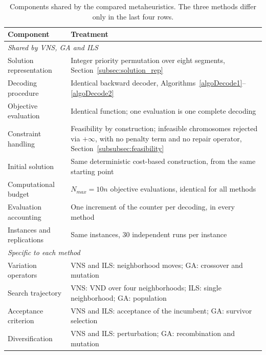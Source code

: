 \documentclass[preprint,12pt,authoryear]{elsarticle}
\begin{document}
\begin{table}[htbp]
    \centering
    \small
    \caption{Components shared by the compared metaheuristics. The three methods differ only in the last four rows.}
    \label{tab:shared_components}
    \begin{tabular}{p{} p{}}
        \toprule
        \textbf{Component} & \textbf{Treatment} \\
        \midrule
        \multicolumn{2}{l}{\textit{Shared by VNS, GA and ILS}} \\
        \midrule
        Solution representation & Integer priority permutation over eight segments, Section~\ref{subsec:solution_rep} \\
        Decoding procedure      & Identical backward decoder, Algorithms~\ref{algoDecode1}--\ref{algoDecode2} \\
        Objective evaluation    & Identical function; one evaluation is one complete decoding \\
        Constraint handling     & Feasibility by construction; infeasible chromosomes rejected via $+\infty$, with no penalty term and no repair operator, Section~\ref{subsubsec:feasibility} \\
        Initial solution        & Same deterministic cost-based construction, from the same starting point \\
        Computational budget    & $N_{max} = 10n$ objective evaluations, identical for all methods \\
        Evaluation accounting   & One increment of the counter per decoding, in every method \\
        Instances and replications & Same instances, 30 independent runs per instance \\
        \midrule
        \multicolumn{2}{l}{\textit{Specific to each method}} \\
        \midrule
        Variation operators     & VNS and ILS: neighborhood moves; GA: crossover and mutation \\
        Search trajectory       & VNS: VND over four neighborhoods; ILS: single neighborhood; GA: population \\
        Acceptance criterion    & VNS and ILS: acceptance of the incumbent; GA: survivor selection \\
        Diversification         & VNS and ILS: perturbation; GA: recombination and mutation \\
        \bottomrule
    \end{tabular}
\end{table}
\end{document}

